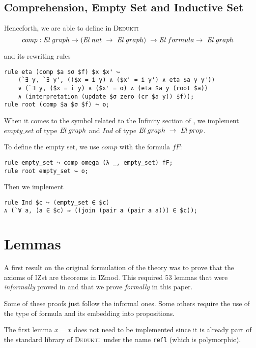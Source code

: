 \documentclass[submission,copyright,creativecommons]{eptcs}
\def\ra{\rightarrow}
\def\El{{\mbox{\it El}}}
\newcommand{\dedukti}{\textsc{Dedukti}}
\begin{document}
\subsection{Comprehension, Empty Set and Inductive Set}

Henceforth, we are able to define in \dedukti
$$comp : \El~graph \ra (\El \ nat \ \ra \ \El~graph) \  \ra \El \ formula \ra \ \El~graph$$

and its rewriting rules

\begin{lstlisting}
rule eta (comp $a $σ $f) $x $x' ↪ 
	(`∃ y, `∃ y', (($x = i y) ∧ ($x' = i y') ∧ eta $a y y')) 
	∨ (`∃ y, ($x = i y) ∧ ($x' = o) ∧ (eta $a y (root $a))
	∧ (interpretation (update $σ zero (cr $a y)) $f));
rule root (comp $a $σ $f) ↪ o;
\end{lstlisting}

When it comes to the symbol related to the Infinity section of \cite[see Section 2.1]{zermodulo}, we implement $empty\_set$ of type $\El~graph$ and $Ind$ of type $\El~graph \ \ra \ \El~prop$.

To define the empty set, we use $comp$ with the formula $fF$:
\begin{lstlisting}
rule empty_set ↪ comp omega (λ _, empty_set) fF;
rule root empty_set ↪ o;
\end{lstlisting}

Then we implement

\begin{lstlisting}
rule Ind $c ↪ (empty_set ∈ $c) 
∧ (`∀ a, (a ∈ $c) ⇒ ((join (pair a (pair a a))) ∈ $c));
\end{lstlisting}


\section{Lemmas}

A first result on the original formulation of the theory was to prove that the axioms of IZst are theorems in IZmod. This required 53 lemmas that were \textit{informally} proved in \cite[see Tables 4 and 5]{zermodulo} and that we prove \textit{formally} in this paper.

Some of these proofs just follow the informal ones. Some others require the use of the type of formula and its embedding into propositions. 

The first lemma $x=x$ does not need to be implemented since it is already part of the standard library of \dedukti \ under the name \texttt{refl} (which is polymorphic).
\end{document}
